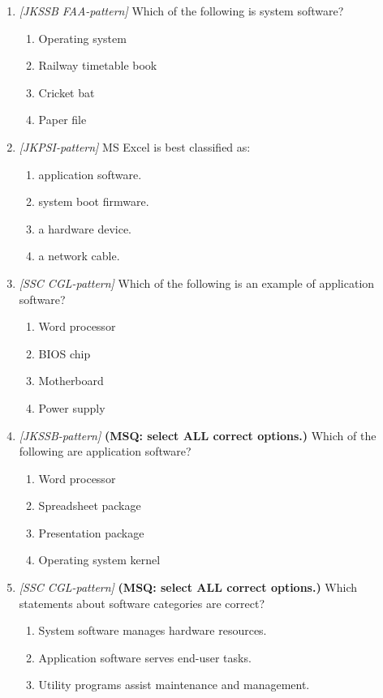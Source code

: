 \begin{enumerate}[label=\textbf{Q\arabic*.}, leftmargin=*]
\item \textit{[JKSSB FAA-pattern]} Which of the following is system software?
  \begin{enumerate}[label=\Alph*.]
    \item Operating system
    \item Railway timetable book
    \item Cricket bat
    \item Paper file
  \end{enumerate}
\item \textit{[JKPSI-pattern]} MS Excel is best classified as:
  \begin{enumerate}[label=\Alph*.]
    \item application software.
    \item system boot firmware.
    \item a hardware device.
    \item a network cable.
  \end{enumerate}
\item \textit{[SSC CGL-pattern]} Which of the following is an example of application software?
  \begin{enumerate}[label=\Alph*.]
    \item Word processor
    \item BIOS chip
    \item Motherboard
    \item Power supply
  \end{enumerate}
\item \textit{[JKSSB-pattern]} \textbf{(MSQ: select ALL correct options.)} Which of the following are application software?
  \begin{enumerate}[label=\Alph*.]
    \item Word processor
    \item Spreadsheet package
    \item Presentation package
    \item Operating system kernel
  \end{enumerate}
\item \textit{[SSC CGL-pattern]} \textbf{(MSQ: select ALL correct options.)} Which statements about software categories are correct?
  \begin{enumerate}[label=\Alph*.]
    \item System software manages hardware resources.
    \item Application software serves end-user tasks.
    \item Utility programs assist maintenance and management.

\end{enumerate}
\end{enumerate}
